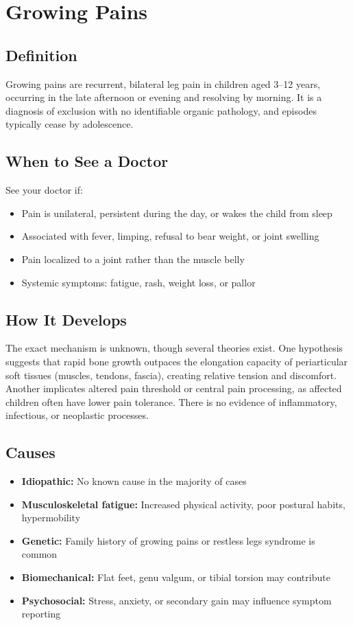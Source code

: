 \chapter{Growing Pains}

\section*{Definition}
Growing pains are recurrent, bilateral leg pain in children aged 3--12 years, occurring in the late afternoon or evening and resolving by morning. It is a diagnosis of exclusion with no identifiable organic pathology, and episodes typically cease by adolescence.

\section*{When to See a Doctor}
See your doctor if:
\begin{itemize}
  \item Pain is unilateral, persistent during the day, or wakes the child from sleep
  \item Associated with fever, limping, refusal to bear weight, or joint swelling
  \item Pain localized to a joint rather than the muscle belly
  \item Systemic symptoms: fatigue, rash, weight loss, or pallor
\end{itemize}

\section*{How It Develops}
The exact mechanism is unknown, though several theories exist. One hypothesis suggests that rapid bone growth outpaces the elongation capacity of periarticular soft tissues (muscles, tendons, fascia), creating relative tension and discomfort. Another implicates altered pain threshold or central pain processing, as affected children often have lower pain tolerance. There is no evidence of inflammatory, infectious, or neoplastic processes.

\section*{Causes}
\begin{itemize}
  \item \textbf{Idiopathic:} No known cause in the majority of cases
  \item \textbf{Musculoskeletal fatigue:} Increased physical activity, poor postural habits, hypermobility
  \item \textbf{Genetic:} Family history of growing pains or restless legs syndrome is common
  \item \textbf{Biomechanical:} Flat feet, genu valgum, or tibial torsion may contribute
  \item \textbf{Psychosocial:} Stress, anxiety, or secondary gain may influence symptom reporting
\end{itemize}


